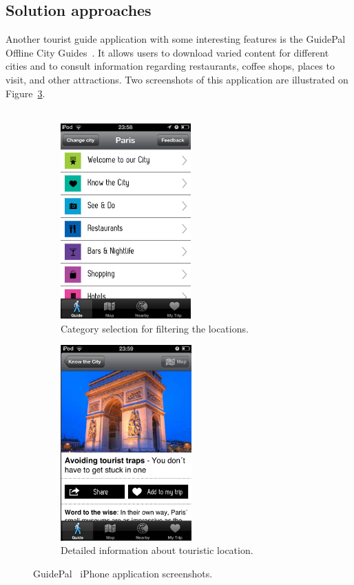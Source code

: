 \subsection{Solution approaches}
\label{subsection:GuidePal}
Another tourist guide application with some interesting features is the GuidePal Offline City Guides~\cite{GuidePalWeb}\cite{GuidePaliPhone}. It allows users to download varied content for different cities and to consult information regarding restaurants, coffee shops, places to visit, and other attractions. Two screenshots of this application are illustrated on Figure~\ref{fig:guidePalIphoneScreenshots}.\\
\\
\begin{figure}
        \centering
        \begin{subfigure}[b]{0.25\textwidth}
                \centering
                \includegraphics[height=7.5cm]{./images/screenshots/screenshot_guidepal_1.jpg}
                \caption{Category selection for filtering the locations.}
                \label{fig:guidePalCategorySelection}
        \end{subfigure}%
        \quad\quad\quad\quad\quad
        \begin{subfigure}[b]{0.25\textwidth}
                \centering
                \includegraphics[height=7.5cm]{./images/screenshots/screenshot_guidepal_2.jpg}
                \caption{Detailed information about touristic location.}
                \label{fig:guidePalDetailedInformation}
        \end{subfigure}
        \caption{GuidePal~\cite{GuidePalWeb}\cite{GuidePaliPhone} iPhone application screenshots.}
        \label{fig:guidePalIphoneScreenshots}
\end{figure}
